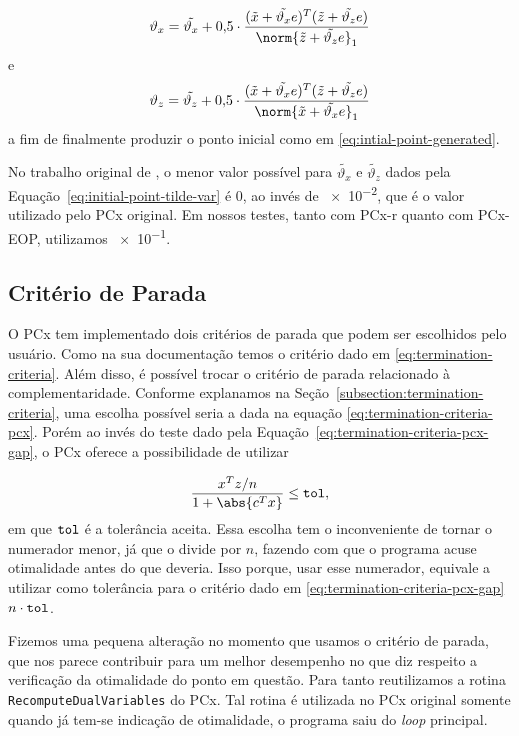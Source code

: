 \begin{equation}
	\label{eq:initial-point-var-x}
\vartheta_{x} = \tilde{\vartheta_x} + \num{0.5}\cdot\dfrac{(\xtil+\tilde{\vartheta_x} e)^{T}(\ztil+\tilde{\vartheta_z} e)}{\norm{\ztil+\tilde{\vartheta_z} e}_{1}} 
\end{equation}
e
\begin{equation}
	\label{eq:initial-point-var-z}
\vartheta_{z} = \tilde{\vartheta_z} + \num{0.5}\cdot\dfrac{(\xtil+\tilde{\vartheta_x} e)^{T}(\ztil+\tilde{\vartheta_z} e)}{\norm{\xtil+\tilde{\vartheta_x} e}_{1}} 
\end{equation}
a fim de finalmente produzir o ponto inicial como em \eqref{eq:intial-point-generated}.

No trabalho original de \textcite{Mehrotra:1992wr}, o menor valor possível para  $\tilde{\vartheta_x}$ e $\tilde{\vartheta_z}$ dados pela Equação~\eqref{eq:initial-point-tilde-var} é $\num{0}$, ao invés de \num{e-2}, 	que é o valor utilizado pelo PCx original. Em nossos testes, tanto com PCx-r quanto com PCx-EOP, utilizamos \num{e-1}. 


\subsection{Critério de Parada}


O PCx tem implementado dois critérios de parada que podem ser escolhidos pelo usuário. Como na sua   documentação temos o critério dado em \eqref{eq:termination-criteria}.   Além disso, é possível trocar o critério de parada relacionado à complementaridade. Conforme explanamos na Seção~\ref{subsection:termination-criteria}, uma escolha possível seria a dada na equação \eqref{eq:termination-criteria-pcx}. Porém ao invés do teste dado pela Equação~\eqref{eq:termination-criteria-pcx-gap}, o PCx oferece a possibilidade de utilizar

\[
\dfrac{x^{T}z/n}{1 + \abs{c^Tx}}\leq
	\tol,
\]
em que $\mathtt{tol}$ é a tolerância aceita. Essa escolha tem o inconveniente de tornar o numerador menor, já que o divide por $n$, fazendo com que o programa acuse otimalidade  antes do que deveria. Isso porque, usar esse numerador, equivale a utilizar como tolerância para o critério dado em \eqref{eq:termination-criteria-pcx-gap} $n\cdot\mathtt{tol}$. 

Fizemos uma pequena alteração no momento que usamos o critério de parada, que nos parece  contribuir para um melhor desempenho  no que diz respeito a verificação da otimalidade do ponto em questão. Para tanto reutilizamos a rotina \verb|RecomputeDualVariables| do PCx. Tal rotina  é utilizada no PCx original somente quando já tem-se indicação de otimalidade, o programa saiu do \emph{loop} principal.

